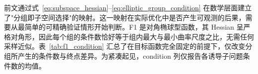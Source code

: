 前文通过式~\eqref{eq:subspace_hessian}--\eqref{eq:elliptic_group_condition} 在数学层面建立了"分组即子空间选择"的映射。这一映射在实际优化中是否产生可观测的后果，需要从最简单的可精确验证情形开始判断。F1 是对角椭球型函数，其 Hessian 呈严格对角形，因此每个组的条件数恰好等于组内最大与最小曲率尺度之比，无需任何采样近似。表~\ref{tab:f1_condition} 汇总了在目标函数完全固定的前提下，仅改变分组所产生的条件数与终点差异。为紧凑起见，condition 列仅报告各诱导子问题条件数的均值。
